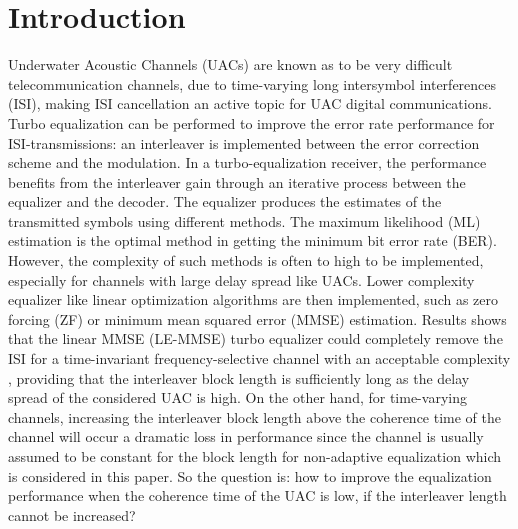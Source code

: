 \documentclass[conference]{IEEEtran}
\begin{document}
\section{Introduction}
Underwater Acoustic Channels (UACs) are known as to be very difficult telecommunication channels, due to time-varying long intersymbol interferences (ISI), making ISI cancellation an active topic for UAC digital communications. Turbo equalization\cite{douillard1995iterative} can be performed to improve the error rate performance for ISI-transmissions: an interleaver is implemented between the error correction scheme and the modulation.
In a turbo-equalization receiver, the performance benefits from the interleaver gain through an iterative process between the equalizer and the decoder. The equalizer produces the estimates of the transmitted symbols using different methods. The maximum likelihood (ML) estimation is the optimal method in getting the minimum bit error rate (BER). However, the complexity of such methods is often to high to be implemented, especially for channels with large delay spread like UACs. Lower complexity equalizer like linear optimization algorithms are then implemented, such as zero forcing (ZF) or minimum mean squared error (MMSE) estimation.
Results shows that the linear MMSE (LE-MMSE) turbo equalizer could completely remove the ISI for a time-invariant frequency-selective channel with an acceptable complexity \cite{laot2001turbo,1006557}, providing that the interleaver block length is sufficiently long as the delay spread of the considered UAC is high. On the other hand, for time-varying channels, increasing the interleaver block length above the coherence time  of the channel will occur a dramatic loss in performance since the channel is usually assumed to be constant for the block length for non-adaptive equalization which is considered in this paper. So the question is: how to improve the equalization performance when the coherence time of the UAC is low, if the interleaver length cannot be increased?
\end{document}
